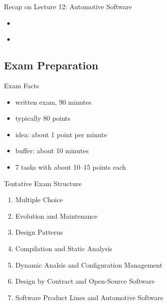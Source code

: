 \begin{frame}{Recap on Lecture 12: Automotive Software}
	\begin{fancycolumns}
		\begin{note}{}
			\begin{itemize}
				\item 
			\end{itemize}
		\end{note}
		\nextcolumn
		\begin{note}{}
			\begin{itemize}
				\item 
			\end{itemize}
		\end{note}
	\end{fancycolumns}
\end{frame}

\subsection{Exam Preparation}
\begin{frame}{\insertsubsection}
	\begin{fancycolumns}[widths={45}]
		\begin{definition}{Exam Facts}
			\begin{itemize}
				\item written exam, 90 minutes
				\item typically 80 points
				\item idea: about 1 point per minute
				\item buffer: about 10 minutes
				\item 7 tasks with about 10--15 points each
			\end{itemize}
		\end{definition}
	\nextcolumn
		\begin{definition}{Tentative Exam Structure}
			\begin{enumerate}
				\item Multiple Choice
				\item Evolution and Maintenance
				\item Design Patterns
				\item Compilation and Static Analysis
				\item Dynamic Analsis and Configuration Management
				\item Design by Contract and Open-Source Software
				\item Software Product Lines and Automotive Software
			\end{enumerate}
		\end{definition}
	\end{fancycolumns}
\end{frame}

